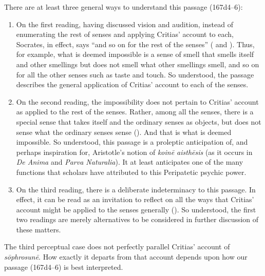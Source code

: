 There are at least three general ways to understand this passage (167d4–6): 
\begin{enumerate}[(1)]
	\item On the first reading, having discussed vision and audition, instead of enumerating the rest of senses and applying Critias' account to each, Socrates, in effect, says ``and so on for the rest of the senses'' (\citealt[113–4]{Bloch:1973aa} and \citealt[89]{Schmid:1998aa}). Thus, for example, what is deemed impossible is a sense of smell that smells itself and other smellings but does not smell what other smellings smell, and so on for all the other senses such as taste and touch. So understood, the passage describes the general application of Critias' account to each of the senses. 
	\item On the second reading, the impossibility does not pertain to Critias' account as applied to the rest of the senses. Rather, among all the senses, there is a special sense that takes itself and the ordinary senses as objects, but does not sense what the ordinary senses sense (\citealt[214–5]{Tuozzo:2011aa}).  And that is what is deemed impossible. So understood, this passage is a proleptic anticipation of, and perhaps inspiration for, Aristotle's notion of \emph{koinē aisthēsis} (as it occurs in \emph{De Anima} and \emph{Parva Naturalia}). It at least anticipates one of the many functions that scholars have attributed to this Peripatetic psychic power. 
	\item On the third reading, there is a deliberate indeterminacy to this passage. In effect, it can be read as an invitation to reflect on all the ways that Critias' account might be applied to the senses generally (\citealt[202]{Tsouna:2022aa}). So understood, the first two readings are merely alternatives to be considered in further discussion of these matters.
\end{enumerate}

The third perceptual case does not perfectly parallel Critias' account of \emph{sōphrosunē}. How exactly it departs from that account depends upon how our passage (167d4–6) is best interpreted.

